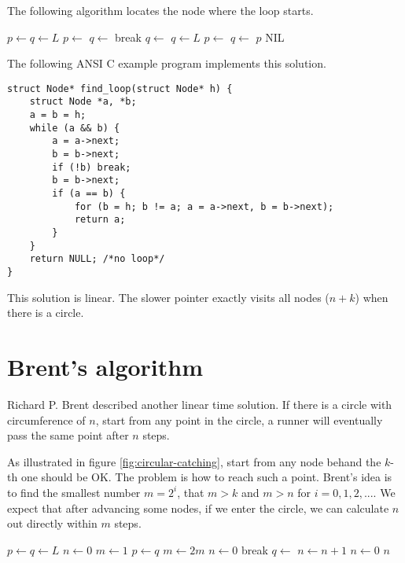 \documentclass{article}
\begin{document}
The following algorithm locates the node where the loop starts.

\begin{algorithmic}[1]
  \State $p \gets q \gets L$
    \State $p \gets$ 
    \State $q \gets$ 
      \State break
    \EndIf
    \State $q \gets$ 
      \State $q \gets L$
        \State $p \gets$ 
        \State $q \gets$ 
      \EndWhile
      \State \Return $p$ 
    \EndIf
  \EndWhile
  \State \Return NIL 
\EndFunction
\end{algorithmic}

The following ANSI C example program implements this solution.

\lstset{language=C}
\begin{lstlisting}
struct Node* find_loop(struct Node* h) {
    struct Node *a, *b;
    a = b = h;
    while (a && b) {
        a = a->next;
        b = b->next;
        if (!b) break;
        b = b->next;
        if (a == b) {
            for (b = h; b != a; a = a->next, b = b->next);
            return a;
        }
    }
    return NULL; /*no loop*/
}
\end{lstlisting}

This solution is linear. The slower pointer exactly visits all nodes ($n + k$) when there is a circle.

\section*{Brent's algorithm}
Richard P. Brent described another linear time solution. If there is a circle with
circumference of $n$, start from any point in the circle, a runner will eventually
pass the same point after $n$ steps.

As illustrated in figure \ref{fig:circular-catching}, start from any node behand the
$k$-th one should be OK. The problem is how to reach such a point. Brent's idea
is to find the smallest number $m = 2^i$, that $m > k$ and $m > n$ for $i = 0, 1, 2, ...$.
We expect that after advancing some nodes, if we enter the circle, we can calculate
$n$ out directly within $m$ steps.

\begin{algorithmic}[1]
  \State $p \gets q \gets L$
  \State $n \gets 0$
  \State $m \gets 1$
  \Repeat
      \State $p \gets q$
      \State $m \gets 2m$
      \State $n \gets 0$
    \EndIf
      \State break
    \EndIf
    \State $q \gets$ 
    \State $n \gets n + 1$
     \State $n \gets 0$
  \EndIf
  \State \Return $n$
\EndFunction
\end{algorithmic}
\end{document}
